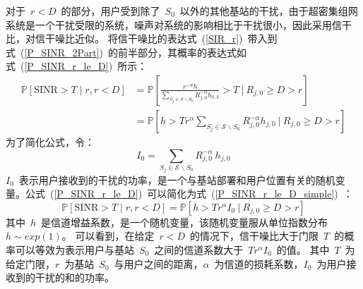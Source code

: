 对于~$r < D$~的部分，用户受到除了~$S_0$~以外的其他基站的干扰，由于超密集组网系统是一个干扰受限的系统，噪声对系统的影响相比于干扰很小，因此采用信干比，对信干噪比近似。
将信干噪比的表达式~(\ref{SIR_r})~带入到式~(\ref{P_SINR_2Part})~的前半部分，其概率的表达式如式~(\ref{P_SINR_r_le_D})~所示：
\begin{equation}\label{P_SINR_r_le_D}
  \begin{aligned}
  \mathbb{P}[\mathrm{SINR}>T \mid r, r < D] & = \mathbb{P}\left[\frac{r^{-\alpha} h}{\sum\limits_{S_j\in \mathcal{S}\backslash S_0} {R_{j,0}^{-\alpha} h_{0,k}}} > T~\bigg|~ R_{j,0} \geq D > r\right]\\
                                            & = \mathbb{P}\left[h > T r ^ \alpha \sum\limits_{S_j\in \mathcal{S}\backslash S_0} {R_{j,0}^{-\alpha} h_{j,0}}~\bigg|~ R_{j,0} \geq D > r \right]
  \end{aligned}
\end{equation}
为了简化公式，令：
\begin{equation}\label{I_define}
  I_0 = \sum\limits_{S_j\in \mathcal{S}\backslash S_0} {R_{j,0}^{-\alpha} ~ h_{j,0}}
\end{equation}
$I_0$~表示用户接收到的干扰的功率，是一个与基站部署和用户位置有关的随机变量。公式~(\ref{P_SINR_r_le_D})~可以简化为式~(\ref{P_SINR_r_le_D_simple})~：
\begin{equation}\label{P_SINR_r_le_D_simple}
  \mathbb{P}[\mathrm{SINR}>T \mid r, r < D] = \mathbb{P}\left[h > T r ^ \alpha I_0 ~\big|~ R_{j,0} \geq D > r \right]
\end{equation}
其中~$h$~是信道增益系数，是一个随机变量，该随机变量服从单位指数分布~$h \sim exp(1)$。
可以看到，在给定~$r<D$~的情况下，信干噪比大于门限~$T$~的概率可以等效为表示用户与基站~$S_0$~之间的信道系数大于~$Tr^{\alpha}I_0$~的值。
其中~$T$~为给定门限，$r$~为基站~$S_0$~与用户之间的距离，$\alpha$~为信道的损耗系数，$I_0$~为用户接收到的干扰的和的功率。

